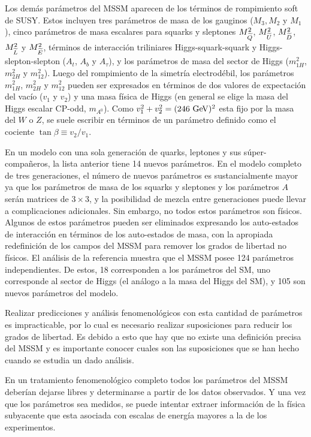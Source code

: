 Los demás parámetros del MSSM aparecen de los términos de rompimiento soft de
SUSY. Estos incluyen tres parámetros de masa de los gauginos ($M_3, M_2$ y
$M_1$), cinco parámetros de masa escalares para squarks y sleptones
$M^2_{\widetilde{Q}}$, $M^2_{\widetilde{U}}$, $M^2_{\widetilde{D}}$, $M^2_{\widetilde{L}}$ y
$M^2_{\widetilde{E}}$, términos de interacción triliniares Higgs-squark-squark y
Higgs-slepton-slepton ($A_t$, $A_b$ y $A_\tau$), y los parámetros de masa del
sector de Higgs ($m^2_{1H}$, $m^2_{2H}$ y $m^2_{12}$). Luego del rompimiento de
la simetría electrodébil, los parámetros $m^2_{1H}$, $m^2_{2H}$ y $m^2_{12}$
pueden ser expresados en términos de dos valores de expectación del vacío ($v_1$
y $v_2$) y una masa física de Higgs (en general se elige la masa del Higgs
escalar CP-odd, $m_{A^0}$). Como $v_1^2+v_2^2=(246 \gev)^2$ esta fijo por la
masa del $W$ o $Z$, se suele escribir en términos de un parámetro definido como
el cociente $\tan \beta \equiv v_2/v_1$.

En un modelo con una sola generación de quarks, leptones y sus
súper-compa\~neros, la lista anterior tiene 14 nuevos parámetros. En el modelo
completo de tres generaciones, el número de nuevos parámetros es sustancialmente
mayor ya que los parámetros de masa de los squarks y sleptones y los parámetros $A$
serán matrices de $3 \times 3$, y la posibilidad de mezcla entre generaciones
puede llevar a complicaciones adicionales. Sin embargo, no todos estos
parámetros son físicos. Algunos de estos parámetros pueden ser eliminados
expresando los auto-estados de interacción en términos de los auto-estados de
masa, con la apropiada redefinición de los campos del MSSM para remover los
grados de libertad no físicos. El análisis de la referencia
\cite{Dimopoulos:1995ju} muestra que el MSSM posee 124 parámetros
independientes. De estos, 18 corresponden a los parámetros del SM, uno
corresponde al sector de Higgs (el análogo a la masa del Higgs del SM), y 105
son nuevos parámetros del modelo.

Realizar predicciones y análisis fenomenológicos con esta cantidad de parámetros es
impracticable, por lo cual es necesario realizar suposiciones para
reducir los grados de libertad. Es debido a esto que hay que no existe una definición
precisa del MSSM y es importante conocer cuales son las suposiciones que se han
hecho cuando se estudia un dado análisis.

En un tratamiento fenomenológico completo todos los parámetros del MSSM deberían
dejarse libres y determinarse a partir de los datos observados. Y una vez que los
parámetros sea medidos, se puede intentar extraer información de la física
subyacente que esta asociada con escalas de energía mayores a la de los
experimentos.

